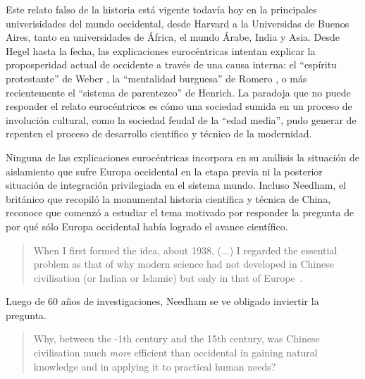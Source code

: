 \documentclass[a4paper,10pt]{book}
\begin{document}

Este relato falso de la historia está vigente todavía hoy en la principales univerisidades del mundo occidental, desde Harvard a la Universidas de Buenos Aires, tanto en universidades de África, el mundo Árabe, India y Asia.
Desde Hegel hasta la fecha, las explicaciones eurocéntricas intentan explicar la proposperidad actual de occidente a través de una causa interna: el ``espíritu protestante'' de Weber \cite{weber}, la ``mentalidad burguesa'' de Romero \cite{romero}, o más recientemente el ``sistema de parentezco''\cite{henrich} de Henrich.
La paradoja que no puede responder el relato eurocéntricos es cómo una sociedad sumida en un proceso de involución cultural, como la sociedad feudal de la ``edad media'', pudo generar de repenten el proceso de desarrollo científico y técnico de la modernidad.


Ninguna de las explicaciones eurocéntricas incorpora en su análisis la situación de aislamiento que sufre Europa occidental en la etapa previa ni la posterior situación de integración privilegiada en el sistema mundo.
Incluso Needham, el británico que recopiló la monumental historia científica y técnica de China, reconoce que comenzó a estudiar el tema motivado por responder la pregunta de por qué sólo Europa occidental había logrado el avance científico.
\begin{quotation}
When I first formed the idea, about 1938, (...) I regarded the essential problem as that of why modern science had not developed in Chinese civilisation (or Indian or Islamic) but only in that of Europe~\cite{needham2004-generalConclusionsAndReflections}.%
\end{quotation}
Luego de 60 años de investigaciones, Needham se ve obligado inviertir la pregunta.
\begin{quotation}
Why, between the -1th century and the 15th century, was Chinese civilisation much \emph{more} efficient than occidental in gaining natural knowledge and in applying it to practical human needs?~\cite{needham2004-generalConclusionsAndReflections}
\end{quotation}
\end{document}
